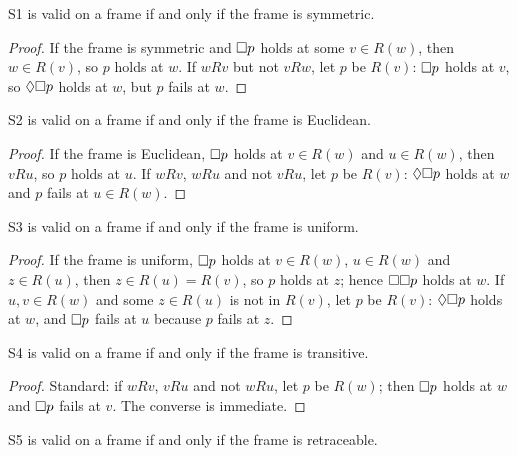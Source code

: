 \documentclass{situationist-preprint}
\begin{document}
\begin{proposition}\label{p:s1}
S1 is valid on a frame if and only if the frame is symmetric.
\end{proposition}

\begin{proof}
If the frame is symmetric and $\mathord{\Box} p$ holds at some $v \in R(w)$, then $w \in R(v)$, so $p$ holds at $w$. If $wRv$ but not $vRw$, let $p$ be $R(v)$: $\mathord{\Box} p$ holds at $v$, so $\mathord{\Diamond}\mathord{\Box} p$ holds at $w$, but $p$ fails at $w$.
\end{proof}

\begin{proposition}\label{p:s2}
S2 is valid on a frame if and only if the frame is Euclidean.
\end{proposition}

\begin{proof}
If the frame is Euclidean, $\mathord{\Box} p$ holds at $v \in R(w)$ and $u \in R(w)$, then $vRu$, so $p$ holds at $u$. If $wRv$, $wRu$ and not $vRu$, let $p$ be $R(v)$: $\mathord{\Diamond}\mathord{\Box} p$ holds at $w$ and $p$ fails at $u \in R(w)$.
\end{proof}

\begin{proposition}\label{p:s3}
S3 is valid on a frame if and only if the frame is uniform.
\end{proposition}

\begin{proof}
If the frame is uniform, $\mathord{\Box} p$ holds at $v \in R(w)$, $u \in R(w)$ and $z \in R(u)$, then $z \in R(u) = R(v)$, so $p$ holds at $z$; hence $\mathord{\Box}\mathord{\Box} p$ holds at $w$. If $u, v \in R(w)$ and some $z \in R(u)$ is not in $R(v)$, let $p$ be $R(v)$: $\mathord{\Diamond}\mathord{\Box} p$ holds at $w$, and $\mathord{\Box} p$ fails at $u$ because $p$ fails at $z$.
\end{proof}

\begin{proposition}\label{p:s4}
S4 is valid on a frame if and only if the frame is transitive.
\end{proposition}

\begin{proof}
Standard: if $wRv$, $vRu$ and not $wRu$, let $p$ be $R(w)$; then $\mathord{\Box} p$ holds at $w$ and $\mathord{\Box} p$ fails at $v$. The converse is immediate.
\end{proof}

\begin{proposition}\label{p:s5}
S5 is valid on a frame if and only if the frame is retraceable.
\end{proposition}
\end{document}
